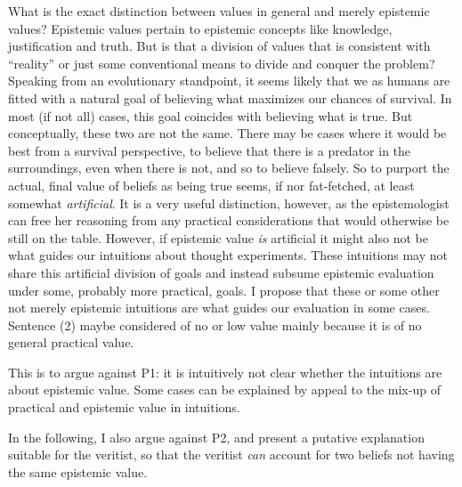 \documentclass[12pt,numbers=noenddot]{scrartcl}
\begin{document}
What is the exact distinction between values in general and merely epistemic values? Epistemic values pertain to epistemic concepts like knowledge, justification and truth. But is that a division of values that is consistent with “reality” or just some conventional means to divide and conquer the problem? Speaking from an evolutionary standpoint, it seems likely that we as humans are fitted with a natural goal of believing what maximizes our chances of survival. In most (if not all) cases, this goal coincides with believing what is true. But conceptually, these two are not the same. There may be cases where it would be best from a survival perspective, to believe that there is a predator in the surroundings, even when there is not, and so to believe falsely. So to purport the actual, final value of beliefs as being true seems, if nor fat-fetched, at least somewhat \emph{artificial}. It is a very useful distinction, however, as the epistemologist can free her reasoning from any practical considerations that would otherwise be still on the table. However, if epistemic value \emph{is} artificial it might also not be what guides our intuitions about thought experiments. These intuitions may not share this artificial division of goals and instead subsume epistemic evaluation under some, probably more practical, goals. I propose that these or some other not merely epistemic intuitions are what guides our evaluation in some cases. Sentence (2) maybe considered of no or low value mainly because it is of no general practical value.

This is to argue against P1: it is intuitively not clear whether the intuitions are about epistemic value. Some cases can be explained by appeal to the mix-up of practical and epistemic value in intuitions.

In the following, I also argue against P2, and present a putative explanation suitable for the veritist, so that the veritist \emph{can} account for two beliefs not having the same epistemic value.
\end{document}
